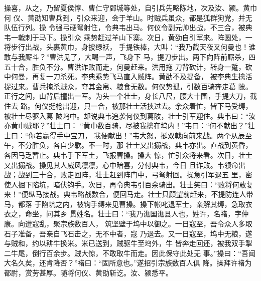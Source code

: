 操喜，从之，乃留夏侯惇、曹仁守鄄城等处，自引兵先略陈地，次及汝、颍。黄巾何
仪、黄劭知曹兵到，引众来迎，会于羊山。时贼兵虽众，都是狐群狗党，并无队伍行列。操
令强弓硬弩射住，令典韦出马。何仪令副元帅出战，不三合，被典韦一戟刺于马下。操引众
乘势赶过羊山下寨。次日，黄劭自引军来。阵圆处，一将步行出战，头裹黄巾，身披绿袄，
手提铁棒，大叫：“我乃截天夜叉何曼也！谁敢与我厮斗？”曹洪见了，大喝一声，飞身下
马，提刀步出。两下向阵前厮杀，四五十合，胜负不分。曹洪诈败而走，何曼赶来。洪用拖
刀背砍计，转身一踅，砍中何曼，再复一刀杀死。李典乘势飞马直入贼阵。黄劭不及提备，
被李典生擒活捉过来。曹兵掩杀贼众，夺其金帛、粮食无数。何仪势孤，引数百骑奔走葛
陂。正行之间，山背后撞出一军。为头一个壮士，身长八尺，腰大十围，手提大刀，截住去
路。何仪挺枪出迎，只一合，被那壮士活挟过去。余众着忙，皆下马受缚，被壮士尽驱入葛
陂坞中。却说典韦追袭何仪到葛陂，壮士引军迎住。典韦曰：“汝亦黄巾贼耶？”壮士曰：
“黄巾数百骑，尽被我擒在坞内！”韦曰：“何不献出？”壮士曰：“你若赢得手中宝刀，
我便献出！”韦大怒，挺双戟向前来战。两个从辰至午，不分胜负，各自少歇。不一时，那
壮士又出搦战，典韦亦出。直战到黄昏，各因马乏暂止。典韦手下军土，飞报曹操。操大
惊，忙引众将来看。次日，壮士又出搦战。操见其人威风凛凛，心中暗喜，分付典韦，今日
且诈败。韦领命出战；战到三十合，败走回阵，壮士赶到阵门中，弓弩射回。操急引军退五
里，密使人掘下陷坑，暗伏钩手。次日，再令典韦引百余骑出。壮士笑曰：“败将何敢复
来！”便纵马接战。典韦略战数合，便回马走。壮士只顾望前赶来，不提防连人带马，都落
于陷坑之内，被钩手缚来见曹操。操下帐叱退军士，亲解其缚，急取衣衣之，命坐，问其乡
贯姓名。壮士曰：“我乃谯国谯县人也，姓许，名褚，字仲康。向遭寇乱，聚宗族数百人，
筑坚壁于坞中以御之。一日寇至，吾令众人多取石子准备，吾亲自飞石击之，无不中者，寇
乃退去。又一日寇至，坞中无粮，遂与贼和，约以耕牛换米。米已送到，贼驱牛至坞外，牛
皆奔走回还，被我双手掣二牛尾，倒行百余步。贼大惊，不敢取牛而走。因此保守此处无
事。”操曰：“吾闻大名久矣，还肯降否？”褚曰：“固所意也。”遂招引宗族数百人俱
降。操拜许褚为都尉，赏劳甚厚。随将何仪、黄劭斩讫。汝、颍悉平。

